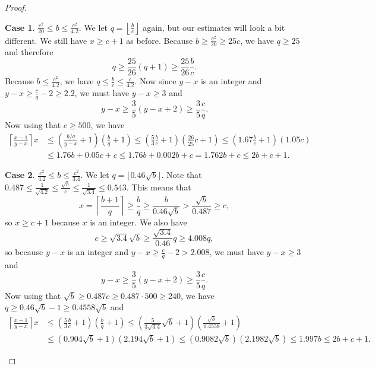 \documentclass[12pt]{amsart}  %
\theoremstyle{definition}
\newtheorem{case}{Case}
\theoremstyle{remark}
\numberwithin{equation}{section}
\begin{document}
\begin{proof}
\begin{case} $\frac{c^2}{20}\leq b\leq\frac{c^2}{4.2}$. We let $q=\left\lfloor\frac bc\right\rfloor$ again, but our estimates will look a bit different. We still have $x\geq c+1$ as before. Because $b\geq\frac{c^2}{20}\geq 25c$, we have $q\geq 25$ and therefore
\begin{equation*}
q\geq \frac {25}{26}(q+1)\geq\frac{25}{26}\frac bc.
\end{equation*}
Because $b\leq\frac{c^2}{4.2}$, we have $q\leq\frac bc\leq\frac c{4.2}$. Now since $y-x$ is an integer and $y-x\geq\frac cq-2\geq 2.2$, we must have $y-x\geq 3$ and
\begin{equation*}
y-x\geq\frac 35(y-x+2)\geq \frac 35\frac cq.
\end{equation*}
Now using that $c\geq 500$, we have
\begin{align*}
\left\lceil\frac{x-1}{y-x}\right\rceil x&\leq\left(\frac{b/q}{y-x}+1\right)\left(\frac bq+1\right)\leq\left(\frac 53\frac bc+1\right)\left(\frac{26}{25}c+1\right)\leq(1.67\frac bc+1)(1.05c)\\&\leq 1.76b+0.05c+c\leq 1.76b+0.002b+c=1.762b+c\leq 2b+c+1.
\end{align*}
\end{case}

\begin{case}$\frac{c^2}{4.2}\leq b\leq\frac{c^2}{3.4}$. We let $q=\lfloor 0.46\sqrt b\rfloor$. Note that $0.487\leq \frac 1{\sqrt{4.2}}\leq\frac{\sqrt b}c\leq\frac 1{\sqrt{3.4}}\leq 0.543$. This means that
\begin{equation*}
x=\left\lceil\frac{b+1}q\right\rceil\geq\frac bq\geq \frac b{0.46\sqrt b}>\frac{\sqrt b}{0.487}\geq c,
\end{equation*}
so $x\geq c+1$ because $x$ is an integer. We also have
\begin{equation*}
c\geq\sqrt{3.4}\sqrt b\geq\frac{\sqrt{3.4}}{0.46}q\geq 4.008q,
\end{equation*}
so because $y-x$ is an integer and $y-x\geq\frac cq-2>2.008$, we must have $y-x\geq 3$ and
\begin{equation*}
y-x\geq\frac 35(y-x+2)\geq\frac 35\frac cq.
\end{equation*}
Now using that $\sqrt b\geq 0.487c\geq 0.487\cdot 500\geq 240$, we have $q\geq 0.46\sqrt b-1\geq 0.4558\sqrt b$ and
\begin{align*}
\left\lceil\frac{x-1}{y-x}\right\rceil x&\leq\left(\frac53\frac bc+1\right)\left(\frac bq+1\right)\leq\left(\frac 5{3\sqrt{3.4}}\sqrt b+1\right)\left(\frac{\sqrt b}{0.4558}+1\right)\\&\leq(0.904\sqrt b+1)(2.194\sqrt b+1)\leq (0.9082\sqrt b)(2.1982\sqrt b)\leq 1.997b\leq 2b+c+1.
\end{align*}
\end{case}


\end{proof}
\end{document}

